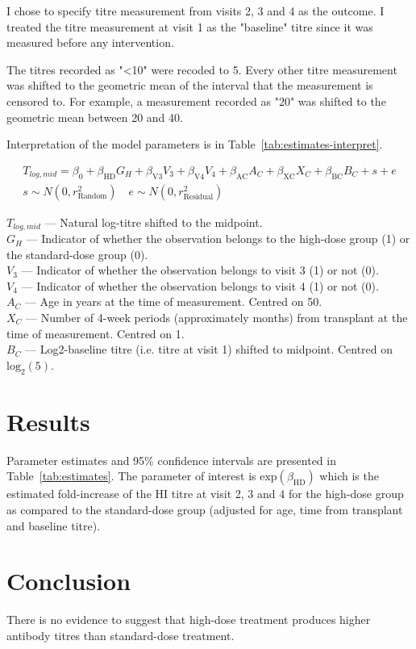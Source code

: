 \documentclass[11pt]{article}
\begin{document}
I chose to specify titre measurement from visits 2, 3 and 4 as the outcome.
I treated the titre measurement at visit 1 as the "baseline" titre since
it was measured before any intervention.

The titres recorded as "<10" were recoded to 5. Every other titre measurement
was shifted to the geometric mean of the interval that the measurement
is censored to. For example, a measurement recorded as "20" was shifted to the
geometric mean between 20 and 40.

Interpretation of the model parameters is in
Table~\ref{tab:estimates-interpret}.

\begin{equation}
    \begin{gathered}
        \label{eq:model}
        T_{log,mid} = \beta_0 + \beta_{\text{HD}}G_H + \beta_{\text{V3}}V_3
        + \beta_{\text{V4}}V_4 + \beta_{\text{AC}}A_C
        + \beta_{\text{XC}}X_C + \beta_{\text{BC}}B_C
        + s + e\\
        s \sim N(0, r^2_{\text{Random}}) \quad e \sim N(0, r^2_{\text{Residual}})
    \end{gathered}
\end{equation}

$T_{log,mid}$ --- Natural log-titre shifted to the midpoint.\\
$G_H$ --- Indicator of whether the observation belongs to the
high-dose group (1) or the standard-dose group (0).\\
$V_3$ --- Indicator of whether the observation belongs to
visit 3 (1) or not (0).\\
$V_4$ --- Indicator of whether the observation belongs to
visit 4 (1) or not (0).\\
$A_C$ --- Age in years at the time of measurement. Centred on 50.\\
$X_C$ --- Number of 4-week periods (approximately months)
from transplant at the time of measurement. Centred on 1.\\
$B_C$ --- Log2-baseline titre (i.e. titre at visit 1) shifted to midpoint.
Centred on $\text{log}_2(5)$.



\section{Results}

Parameter estimates and 95\% confidence intervals
are presented in Table~\ref{tab:estimates}.
The parameter of interest is $\text{exp}(\beta_{\text{HD}})$
which is the estimated
fold-increase of the HI titre at visit 2, 3 and 4 for the high-dose group
as compared to the standard-dose group (adjusted for age, time from transplant
and baseline titre).



\section{Conclusion}

There is no evidence to suggest that high-dose treatment produces
higher antibody
titres than standard-dose treatment.
\end{document}
